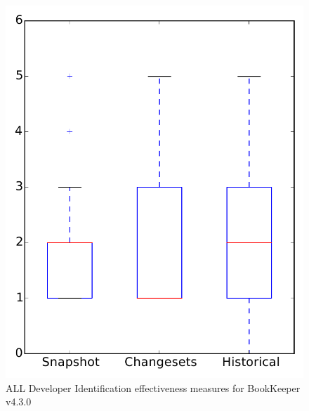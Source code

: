 
\begin{figure}
\centering
\includegraphics[height=0.4\textheight]{figures/dit/all_bookkeeper}
\caption{ALL Developer Identification effectiveness measures for BookKeeper v4.3.0}
\label{fig:dit:all:bookkeeper}
\end{figure}
